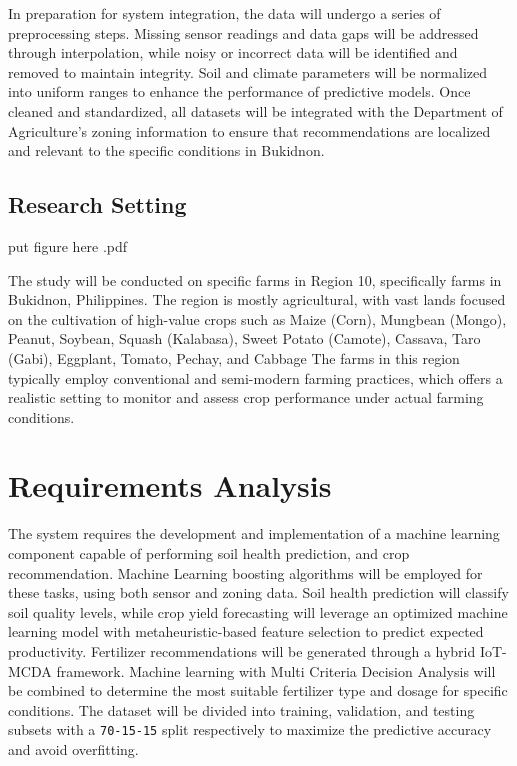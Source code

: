 {	In preparation for system integration, the data will undergo a series of preprocessing steps. Missing sensor readings and data gaps will be addressed through interpolation, while noisy or incorrect data will be identified and removed to maintain integrity. Soil and climate parameters will be normalized into uniform ranges to enhance the performance of predictive models. Once cleaned and standardized, all datasets will be integrated with the Department of Agriculture’s zoning information to ensure that recommendations are localized and relevant to the specific conditions in Bukidnon.
	
	\subsection{Research Setting}
	put figure here .pdf
	
	The study will be conducted on specific farms in Region 10, specifically farms in Bukidnon, Philippines. The region is mostly agricultural, with vast lands focused on the cultivation of high-value crops such as Maize (Corn), Mungbean (Mongo), Peanut, Soybean, Squash (Kalabasa), Sweet Potato (Camote), Cassava, Taro (Gabi), Eggplant, Tomato, Pechay, and Cabbage The farms in this region typically employ conventional and semi-modern farming practices, which offers a realistic setting to monitor and assess crop performance under actual farming conditions.
	
	\section{Requirements Analysis}
	The system requires the development and implementation of a machine learning component capable of performing soil health prediction, and  crop recommendation. Machine Learning boosting algorithms will be employed for these tasks, using both sensor and zoning data. Soil health prediction will classify soil quality levels, while crop yield forecasting will leverage an optimized machine learning model with metaheuristic-based feature selection to predict expected productivity. Fertilizer recommendations will be generated through a hybrid IoT-MCDA framework. Machine learning with Multi Criteria Decision Analysis will be combined to determine the most suitable fertilizer type and dosage for specific conditions. The dataset will be divided into training, validation, and testing subsets with a \texttt{70-15-15} split respectively to maximize the predictive accuracy and avoid overfitting.
	
}
